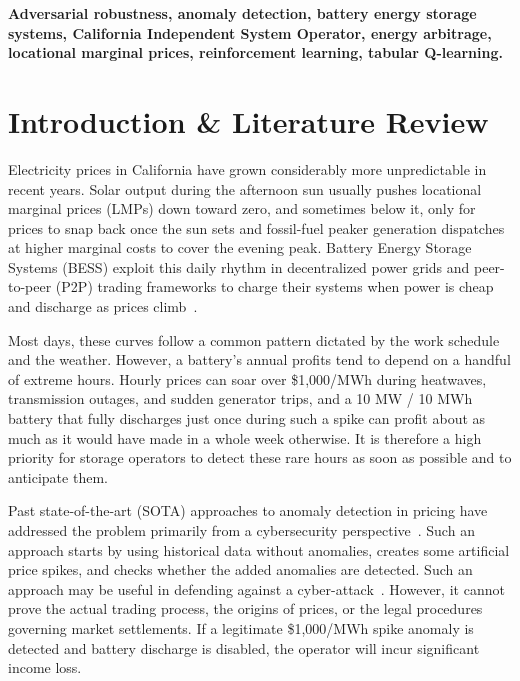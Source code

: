 \documentclass[journal]{IEEEtran}
\begin{document}
\begin{IEEEkeywords}
\bfseries
Adversarial robustness, anomaly detection, battery energy storage systems, California Independent System Operator, energy arbitrage, locational marginal prices, reinforcement learning, tabular Q-learning.
\end{IEEEkeywords}

\section{Introduction \& Literature Review}
\label{sec:intro}

Electricity prices in California have grown considerably more unpredictable in recent years. Solar output during the afternoon sun usually pushes locational marginal prices (LMPs) down toward zero, and sometimes below it, only for prices to snap back once the sun sets and fossil-fuel peaker generation dispatches at higher marginal costs to cover the evening peak. Battery Energy Storage Systems (BESS) exploit this daily rhythm in decentralized power grids and peer-to-peer (P2P) trading frameworks to charge their systems when power is cheap and discharge as prices climb~\cite{Chen_DRL_BESS, P2P_Systems_Book}.

Most days, these curves follow a common pattern dictated by the work schedule and the weather. However, a battery's annual profits tend to depend on a handful of extreme hours. Hourly prices can soar over \$1,000/MWh during heatwaves, transmission outages, and sudden generator trips, and a 10 MW / 10 MWh battery that fully discharges just once during such a spike can profit about as much as it would have made in a whole week otherwise. It is therefore a high priority for storage operators to detect these rare hours as soon as possible and to anticipate them. 

Past state-of-the-art (SOTA) approaches to anomaly detection in pricing have addressed the problem primarily from a cybersecurity perspective~\cite{Vulnerability_Analysis, AE_Anomaly, Xie_FDI}. Such an approach starts by using historical data without anomalies, creates some artificial price spikes, and checks whether the added anomalies are detected. Such an approach may be useful in defending against a cyber-attack~\cite{Kurt_FDI_Detection}. However, it cannot prove the actual trading process, the origins of prices, or the legal procedures governing market settlements. If a legitimate \$1,000/MWh spike anomaly is detected and battery discharge is disabled, the operator will incur significant income loss.
\end{document}
